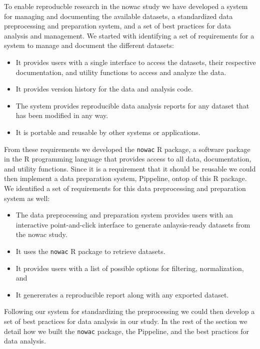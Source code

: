 To enable reproducble research in the \gls{nowac} study we have developed a
system for managing and documenting the available datasets, a standardized data
preprocessing and preparation system, and a set of best practices for data
analysis and management. We started with identifying a set of requirements for a
system to manage and document the different datasets: 

\begin{itemize} 
    \item It provides users with a single interface to access the datasets,
        their respective documentation, and utility functions to access and
        analyze the data.
    \item It provides version history for the data and analysis code. 
    \item The system provides reproducible data analysis reports for any
        dataset that has been modified in any way. 
    \item It is portable and reusable by other systems or applications. 
\end{itemize} 

From these requirements we developed the \texttt{nowac} R package, a software
package in the R programming language that provides access to all data,
documentation, and utility functions. Since it is a requirement that it should
be reusable we could then implement a data preparation system, Pippeline, ontop
of this R package. We identified a set of requirements for this data
preprocessing and preparation system as well: 

\begin{itemize} 
    \item The data preprocessing and preparation system provides users with an
        interactive point-and-click interface to generate anlaysis-ready
        datasets from the \gls{nowac} study. 
    \item It uses the \texttt{nowac} R package to retrieve datasets. 
    \item It provides users with a list of possible options for filtering,
        normalization, and      
    \item It genererates a reproducible report along with any exported dataset.
        
\end{itemize} 

Following our system for standardizing the preprocessing we could then develop a
set of best practices for data analysis in our study. In the rest of the section
we detail how we built the \texttt{nowac} package, the Pippeline, and the best
practices for data analysis. 


